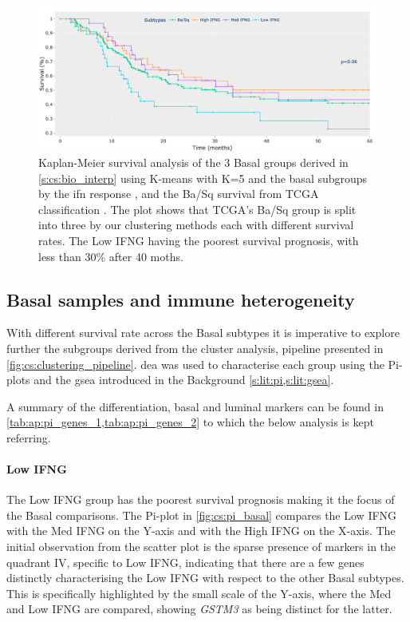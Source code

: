\begin{figure}[!htb]    
    \centering
    \includegraphics[width=1.0\textwidth,keepaspectratio]{Sections/ClusteringAnalysis/Resources/discussion/survival_basal.png}
    \centering
    \caption[New Basal subgroups and their survival prognosis]{Kaplan-Meier survival analysis of the 3 Basal groups derived in \cref{s:cs:bio_interp} using K-means with K=5 and the basal subgroups by the \acrshort{ifn} response \citep{Baker2022-bj}, and the Ba/Sq survival from TCGA classification \citep{Robertson2017-mg}. The plot shows that TCGA's Ba/Sq group is split into three by our clustering methods each with different survival rates. The Low IFNG having the poorest survival prognosis, with less than 30\% after 40 moths.}
    \label{fig:cs:basal_survival}
\end{figure}

\subsection{Basal samples and immune heterogeneity} \label{s:cs:basal_interp}

With different survival rate across the Basal subtypes it is imperative to explore further the subgroups derived from the cluster analysis, pipeline presented in \cref{fig:cs:clustering_pipeline}. \acrlong{dea} was used to characterise each group using the Pi-plots and the \acrlong{gsea} introduced in the Background \cref{s:lit:pi,s:lit:gsea}. 

A summary of the differentiation, basal and luminal markers can be found in \cref{tab:ap:pi_genes_1,tab:ap:pi_genes_2} to which the below analysis is kept referring.

\paragraph*{Low IFNG}

The Low IFNG group has the poorest survival prognosis making it the focus of the Basal comparisons. The Pi-plot in \cref{fig:cs:pi_basal} compares the Low IFNG with the Med IFNG on the Y-axis and with the High IFNG on the X-axis. The initial observation from the scatter plot is the sparse presence of markers in the quadrant IV, specific to Low IFNG, indicating that there are a few genes distinctly characterising the Low IFNG with respect to the other Basal subtypes. This is specifically highlighted by the small scale of the Y-axis, where the Med and Low IFNG are compared, showing \textit{GSTM3} as being distinct for the latter.

